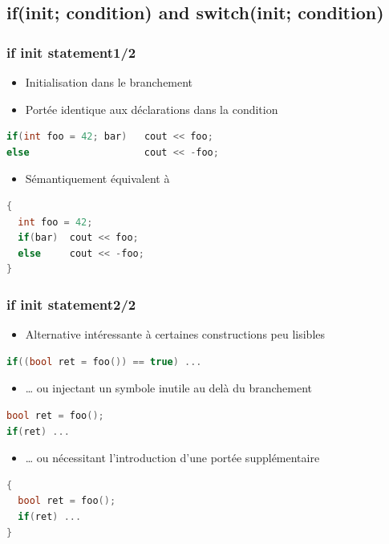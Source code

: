 \documentclass[C++.tex]{subfiles}
\begin{document}
\subsection*{if(init; condition) and switch(init; condition)}
\begin{frame}[fragile]
	\frametitle{if init statement\titlehfill{}1/2}
	\begin{itemize}
		\item Initialisation dans le branchement
		\item Portée identique aux déclarations dans la condition
	\end{itemize}

	\begin{lstlisting}[language=C++]
if(int foo = 42; bar)   cout << foo;
else                    cout << -foo;\end{lstlisting}

	\begin{itemize}
		\item Sémantiquement équivalent à
	\end{itemize}

	\begin{lstlisting}[language=C++]
{
  int foo = 42;
  if(bar)  cout << foo;
  else     cout << -foo;
}\end{lstlisting}
\end{frame}

\begin{frame}[fragile]
	\frametitle{if init statement\titlehfill{}2/2}
	\begin{itemize}
		\item Alternative intéressante à certaines constructions peu lisibles
	\end{itemize}

	\begin{lstlisting}[language=C++]
if((bool ret = foo()) == true) ...\end{lstlisting}

	\begin{itemize}
		\item \ldots{} ou injectant un symbole inutile au delà du branchement
	\end{itemize}

	\begin{lstlisting}[language=C++]
bool ret = foo();
if(ret) ...\end{lstlisting}

	\begin{itemize}
		\item \ldots{} ou nécessitant l'introduction d'une portée supplémentaire
	\end{itemize}

	\begin{lstlisting}[language=C++]
{
  bool ret = foo();
  if(ret) ...
}\end{lstlisting}
\end{frame}
\end{document}
